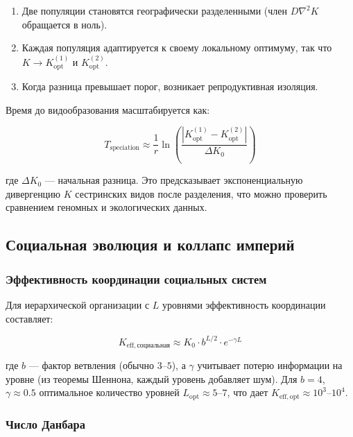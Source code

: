 \documentclass[12pt,a4paper]{article}
\theoremstyle{remark}
\newcommand{\Keffopt}{K_{\mathrm{opt}}}
\begin{document}
	\begin{enumerate}
		\item Две популяции становятся географически разделенными (член $D \nabla^2 K$ обращается в ноль).
		\item Каждая популяция адаптируется к своему локальному оптимуму, так что $K \to \Keffopt^{(1)}$ и $\Keffopt^{(2)}$.
		\item Когда разница превышает порог, возникает репродуктивная изоляция.
	\end{enumerate}
	
	Время до видообразования масштабируется как:
	
	\begin{equation}
		T_{\text{speciation}} \approx \frac{1}{r} \ln\left( \frac{|\Keffopt^{(1)} - \Keffopt^{(2)}|}{\Delta K_0} \right)
		\label{eq:speciation-time}
	\end{equation}
	
	где $\Delta K_0$ — начальная разница. Это предсказывает экспоненциальную дивергенцию $K$ сестринских видов после разделения, что можно проверить сравнением геномных и экологических данных.
	
	\subsection{Социальная эволюция и коллапс империй}
	\label{subsec:social}
	
	\subsubsection{Эффективность координации социальных систем}
	
	Для иерархической организации с $L$ уровнями эффективность координации составляет:
	
	\begin{equation}
		K_{\mathrm{eff},\text{социальная}} \approx K_0 \cdot b^{L/2} \cdot e^{-\gamma L}
		\label{eq:social-keff}
	\end{equation}
	
	где $b$ — фактор ветвления (обычно $3$--$5$), а $\gamma$ учитывает потерю информации на уровне (из теоремы Шеннона, каждый уровень добавляет шум). Для $b=4$, $\gamma \approx 0.5$ оптимальное количество уровней $L_{\text{opt}} \approx 5$--$7$, что дает $K_{\mathrm{eff},\text{opt}} \approx 10^3$--$10^4$.
	
	\subsubsection{Число Данбара}
	
\end{document}
